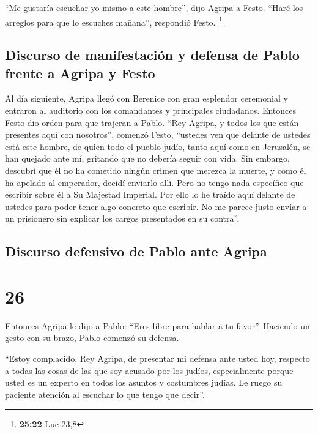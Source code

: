  ``Me gustaría escuchar yo mismo a este hombre'', dijo
Agripa a Festo. ``Haré los arreglos para que lo escuches mañana'',
respondió Festo. \footnote{\textbf{25:22} Luc 23,8}

\hypertarget{discurso-de-manifestaciuxf3n-y-defensa-de-pablo-frente-a-agripa-y-festo}{%
\subsection{Discurso de manifestación y defensa de Pablo frente a Agripa
y
Festo}\label{discurso-de-manifestaciuxf3n-y-defensa-de-pablo-frente-a-agripa-y-festo}}

 Al día siguiente, Agripa llegó con Berenice con gran
esplendor ceremonial y entraron al auditorio con los comandantes y
principales ciudadanos. Entonces Festo dio orden para que trajeran a
Pablo.  ``Rey Agripa, y todos los que están presentes
aquí con nosotros'', comenzó Festo, ``ustedes ven que delante de ustedes
está este hombre, de quien todo el pueblo judío, tanto aquí como en
Jerusalén, se han quejado ante mí, gritando que no debería seguir con
vida.  Sin embargo, descubrí que él no ha cometido ningún
crimen que merezca la muerte, y como él ha apelado al emperador, decidí
enviarlo allí.  Pero no tengo nada específico que
escribir sobre él a Su Majestad Imperial. Por ello lo he traído aquí
delante de ustedes para poder tener algo concreto que escribir.
 No me parece justo enviar a un prisionero sin explicar
los cargos presentados en su contra''.

\hypertarget{discurso-defensivo-de-pablo-ante-agripa}{%
\subsection{Discurso defensivo de Pablo ante
Agripa}\label{discurso-defensivo-de-pablo-ante-agripa}}

\hypertarget{section-25}{%
\section{26}\label{section-25}}

 Entonces Agripa le dijo a Pablo: ``Eres libre para hablar
a tu favor''. Haciendo un gesto con su brazo, Pablo comenzó su defensa.

 ``Estoy complacido, Rey Agripa, de presentar mi defensa
ante usted hoy, respecto a todas las cosas de las que soy acusado por
los judíos,  especialmente porque usted es un experto en
todos los asuntos y costumbres judías. Le ruego su paciente atención al
escuchar lo que tengo que decir''.

